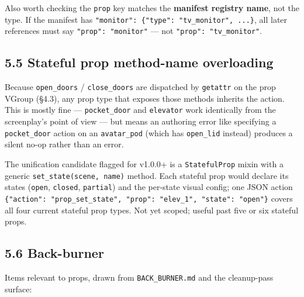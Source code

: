 \documentclass[
  12pt,
  letterpaper,
]{book}
\begin{document}
Also worth checking the \texttt{prop} key matches the \textbf{manifest
registry name}, not the type. If the manifest has
\texttt{"monitor":\ \{"type":\ "tv\_monitor",\ ...\}}, all later
references must say \texttt{"prop":\ "monitor"} --- not
\texttt{"prop":\ "tv\_monitor"}.

\subsection{5.5 Stateful prop method-name
overloading}\label{stateful-prop-method-name-overloading}

Because \texttt{open\_doors} / \texttt{close\_doors} are dispatched by
\texttt{getattr} on the prop VGroup (§4.3), any prop type that exposes
those methods inherits the action. This is mostly fine ---
\texttt{pocket\_door} and \texttt{elevator} work identically from the
screenplay's point of view --- but means an authoring error like
specifying a \texttt{pocket\_door} action on an \texttt{avatar\_pod}
(which has \texttt{open\_lid} instead) produces a silent no-op rather
than an error.

The unification candidate flagged for v1.0.0+ is a \texttt{StatefulProp}
mixin with a generic \texttt{set\_state(scene,\ name)} method. Each
stateful prop would declare its states (\texttt{open}, \texttt{closed},
\texttt{partial}) and the per-state visual config; one JSON action
\texttt{\{"action":\ "prop\_set\_state",\ "prop":\ "elev\_1",\ "state":\ "open"\}}
covers all four current stateful prop types. Not yet scoped; useful past
five or six stateful props.

\subsection{5.6 Back-burner}\label{back-burner}

Items relevant to props, drawn from \texttt{BACK\_BURNER.md} and the
cleanup-pass surface:
\end{document}

